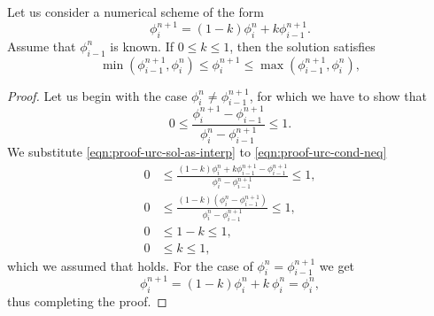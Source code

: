 \documentclass[../thesis.tex]{subfiles}
\begin{document}
\begin{theorem}
    Let us consider a numerical scheme of the form
    \begin{equation}\label{eqn:proof-urc-sol-as-interp}
    \phi_{i}^{n+1} =
    (1-k)\phi_{i}^{n} + k\phi_{i-1}^{n+1}.
    \end{equation}
    Assume that \(\phi_{i-1}^{n}\) is known. If \(0 \leq k \leq 1\), then the solution satisfies
    \begin{equation}\label{eqn:implicit-upwind-range-condition-theorem}
        \min\left( \phi_{i-1}^{n+1},\phi_{i}^{n} \right)
        \leq
        \phi_{i}^{n+1}
        \leq
        \max\left( \phi_{i-1}^{n+1},\phi_{i}^{n} \right),
    \end{equation}
    \begin{proof}
        Let us begin with the case \(\phi_{i}^{n} \neq \phi_{i-1}^{n+1}\), for which we have to show that
        \begin{equation}\label{eqn:proof-urc-cond-neq}
            0
            \leq
            \frac{\phi_{i}^{n+1} - \phi_{i-1}^{n+1}}{\phi_{i}^{n} - \phi_{i-1}^{n+1}}
            \leq
            1.
        \end{equation}
        We substitute \eqref{eqn:proof-urc-sol-as-interp} to \eqref{eqn:proof-urc-cond-neq}
        \begin{equation*}
            \begin{split}
                0
                &\leq
                \frac{(1-k)\phi_{i}^{n} + k\phi_{i-1}^{n+1} - \phi_{i-1}^{n+1}}{\phi_{i}^{n} - \phi_{i-1}^{n+1}}
                \leq
                1,
                \\
                0
                &\leq
                \frac{(1-k)\left( \phi_{i}^{n} - \phi_{i-1}^{n+1} \right)}{\phi_{i}^{n} - \phi_{i-1}^{n+1}}
                \leq
                1,
                \\
                0
                &\leq
                1-k
                \leq
                1,\\
                0
                &\leq
                k
                \leq
                1,
            \end{split}
        \end{equation*}
        which we assumed that holds.
    For the case of \(\phi_{i}^{n} = \phi_{i-1}^{n+1}\) we get
    \[
        \phi_{i}^{n+1} = (1-k)\phi_{i}^{n} + k~\phi_{i}^{n} = \phi_{i}^{n},
    \]
    thus completing the proof.
    \end{proof}
\end{theorem}
\end{document}
